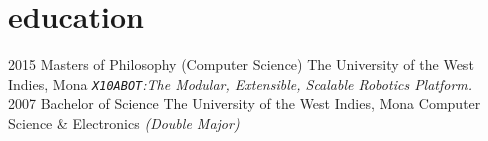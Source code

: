 \documentclass[]{friggeri-cv} %
\begin{document}
\begin{entrylist}
 \end{entrylist}
 \newpage

\section{education}

\begin{entrylist}
\entry
{2015}
{Masters {\normalfont of Philosophy (Computer Science)}}
{The University of the West Indies, Mona}
{\emph{\texttt{X10ABOT}:The Modular, Extensible, Scalable Robotics Platform.}} \\
\entry
{2007}
{Bachelor {\normalfont of Science}}
{The University of the West Indies, Mona}
{Computer Science \& Electronics \emph{(Double Major)}}
\end{entrylist}

\end{document}
